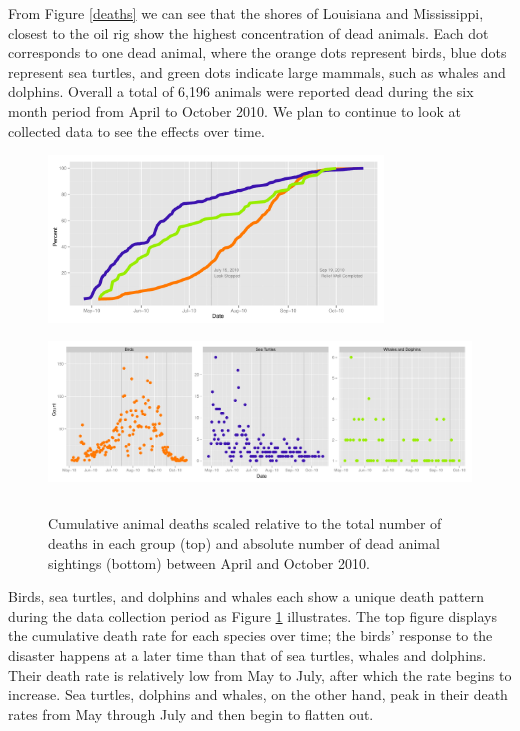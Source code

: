 \documentclass[authoryear,12pt]{elsarticle}
\begin{document}
{From Figure \ref{deaths} we can see that} the shores of Louisiana and Mississippi, closest to the oil rig show the highest concentration of dead animals. Each  {dot} corresponds to one dead  {animal, where} the orange dots represent birds, blue dots  {represent} sea turtles, and green dots indicate large mammals, such as whales and dolphins. Overall a total of 6,196 animals were reported dead during  {the} six month period  {from April to October 2010}. We plan to continue to look at collected data to see the effects over time. 

	\begin{figure}[htbp] %
   \centering
   \includegraphics[height=1.75in]{death-rates.pdf} 
    \includegraphics[height=1.75in]{daily-death-counts.pdf}
   \caption{Cumulative animal deaths scaled relative to the total number of deaths in each group (top) and absolute number of dead animal sightings (bottom) between April and October 2010.\newline}
   \label{death rates}
\end{figure}

Birds, sea turtles, and dolphins and whales  {each show a} unique death pattern during the data collection period as Figure \ref{death rates} illustrates. The  {top} figure  {displays the} cumulative death rate for each species over time; the {birds' response} to the disaster  happens at a {later} time than that of sea turtles, whales and dolphins.  {Their death rate is relatively low} from May to July, after which the rate beg{ins} to increase. Sea turtles, dolphins and whales, on the other hand, {peak in their} death rates from May  {through} July and  {then} begin to flatten out. \\
\end{document}
